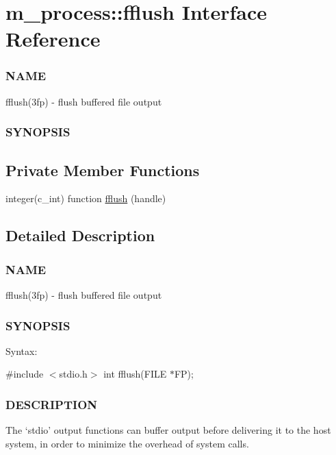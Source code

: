\hypertarget{interfacem__process_1_1fflush}{}\section{m\+\_\+process\+:\+:fflush Interface Reference}
\label{interfacem__process_1_1fflush}


\subsubsection*{N\+A\+ME}

fflush(3fp) -\/ flush buffered file output \subsubsection*{S\+Y\+N\+O\+P\+S\+IS} 


\subsection*{Private Member Functions}
\begin{DoxyCompactItemize}
\item 
integer(c\+\_\+int) function \mbox{\hyperlink{interfacem__process_1_1fflush_a77d0db933d548b3ee20b064e705a408e}{fflush}} (handle)
\end{DoxyCompactItemize}


\subsection{Detailed Description}
\subsubsection*{N\+A\+ME}

fflush(3fp) -\/ flush buffered file output \subsubsection*{S\+Y\+N\+O\+P\+S\+IS}

Syntax\+:

\#include $<$stdio.\+h$>$ int fflush(\+F\+I\+L\+E $\ast$\+F\+P); \subsubsection*{D\+E\+S\+C\+R\+I\+P\+T\+I\+ON}

The `stdio' output functions can buffer output before delivering it to the host system, in order to minimize the overhead of system calls.

